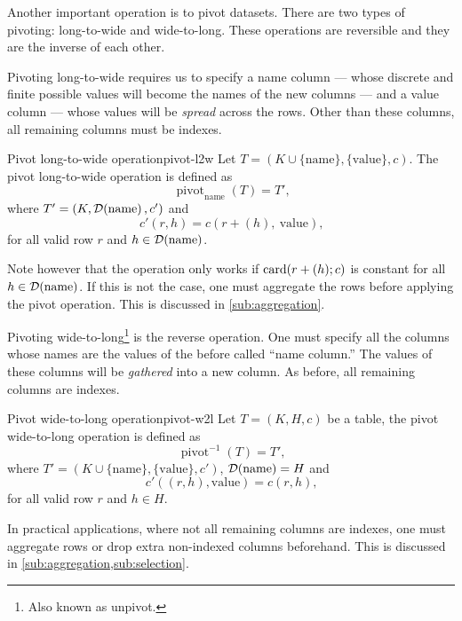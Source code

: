 Another important operation is to pivot datasets.  There are two types of pivoting:
long-to-wide and wide-to-long.  These operations are reversible  and they are the inverse
of each other.

Pivoting long-to-wide requires us to specify a name column --- whose discrete and finite
possible values will become the names of the new columns --- and a value column --- whose
values will be \emph{spread} across the rows.  Other than these columns, all remaining columns
must be indexes.

\begin{defbox}{Pivot long-to-wide operation}{pivot-l2w}
  Let $T = (K \cup \{\text{name}\}, \{\text{value}\}, c)$. The pivot long-to-wide
  operation is defined as \[
    \operatorname{pivot}_\text{name}(T) = T'\text{,}
  \] where $T' = (K, \domainof{\text{name}}, c')$ and \[
    c'(r, h) = c\left(r + (h),~\text{value}\right)\text{,}
  \]
  for all valid row $r$ and $h \in \domainof{\text{name}}$.
\end{defbox}

Note however that the operation only works if $\rowcard[r + (h); c]$ is constant for all
$h \in \domainof{\text{name}}$.  If this is not the case, one must aggregate the rows
before applying the pivot operation.  This is discussed in \cref{sub:aggregation}.

Pivoting wide-to-long\footnote{Also known as unpivot.} is the reverse operation. One must
specify all the columns whose names are the values of the before called ``name column.''
The values of these columns will be \emph{gathered} into a new column. As before, all
remaining columns are indexes.

\begin{defbox}{Pivot wide-to-long operation}{pivot-w2l}
  Let $T = (K, H, c)$ be a table, the pivot wide-to-long
  operation is defined as \[
    \operatorname{pivot}^{-1}(T) = T'\text{,}
  \] where $T' = (K \cup \{\text{name}\}, \{\text{value}\}, c')$, $\domainof{\text{name}}
  = H$ and \[
    c'((r, h), \text{value}) = c(r, h)\text{,}
  \] for all valid row $r$ and $h \in H$.
\end{defbox}

In practical applications, where not all remaining columns are indexes, one must aggregate
rows or drop extra non-indexed columns beforehand.  This is discussed in
\cref{sub:aggregation,sub:selection}.

